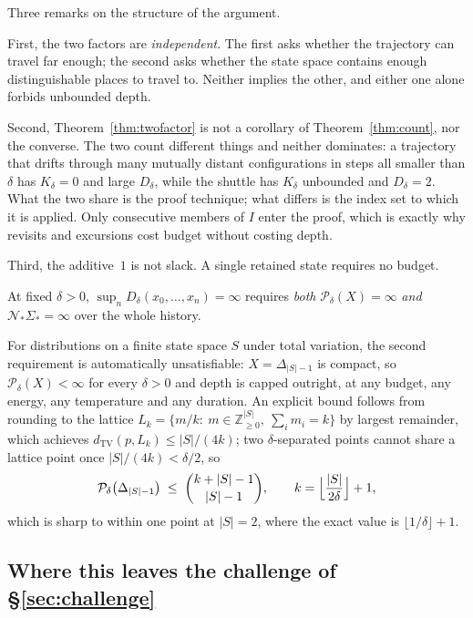 Three remarks on the structure of the argument.

First, the two factors are \emph{independent}. The first asks whether the trajectory
can travel far enough; the second asks whether the state space contains enough
distinguishable places to travel to. Neither implies the other, and either one alone
forbids unbounded depth.

Second, Theorem~\ref{thm:twofactor} is not a corollary of Theorem~\ref{thm:count},
nor the converse. The two count different things and neither dominates: a trajectory
that drifts through many mutually distant configurations in steps all smaller than
$\delta$ has $K_\delta=0$ and large $D_\delta$, while the shuttle has $K_\delta$
unbounded and $D_\delta=2$. What the two share is the proof technique; what differs
is the index set to which it is applied. Only consecutive members of $I$ enter the
proof, which is exactly why revisits and excursions cost budget without costing
depth.

Third, the additive~$1$ is not slack. A single retained state requires no budget.

\begin{corollary}
\label{cor:unbounded}
At fixed $\delta>0$, $\sup_n D_\delta(x_0,\dots,x_n)=\infty$ requires \emph{both}
$\mathcal{P}_\delta(X)=\infty$ \emph{and} $\mathcal{N}_*\Sigma_*=\infty$ over the
whole history.
\end{corollary}

For distributions on a finite state space $S$ under total variation, the second
requirement is automatically unsatisfiable: $X=\Delta_{|S|-1}$ is compact, so
$\mathcal{P}_\delta(X)<\infty$ for every $\delta>0$ and depth is capped outright, at
any budget, any energy, any temperature and any duration. An explicit bound follows
from rounding to the lattice $L_k=\{m/k:\ m\in\mathbb{Z}_{\ge0}^{|S|},\ \sum_i m_i=k\}$
by largest remainder, which achieves $d_{\mathrm{TV}}(p,L_k)\le|S|/(4k)$; two
$\delta$-separated points cannot share a lattice point once $|S|/(4k)<\delta/2$, so
\begin{equation}
\label{eq:packingub}
  \mathcal{P}_\delta\bigl(\Delta_{|S|-1}\bigr)
  \;\le\; \binom{k+|S|-1}{|S|-1},
  \qquad k=\Bigl\lfloor \frac{|S|}{2\delta}\Bigr\rfloor+1 ,
\end{equation}
which is sharp to within one point at $|S|=2$, where the exact value is
$\lfloor1/\delta\rfloor+1$.

\subsection{Where this leaves the challenge of \S\ref{sec:challenge}}

